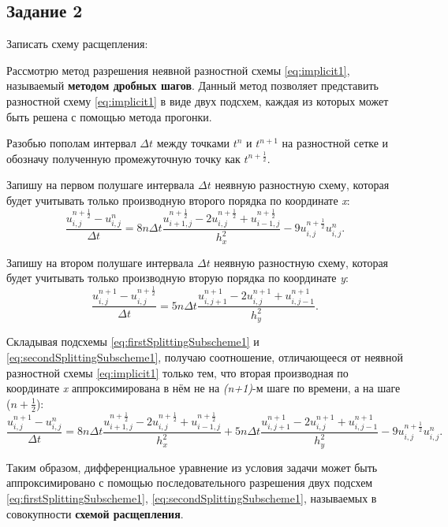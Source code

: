 \documentclass[12pt, a4paper]{report}
\begin{document}
	\subsection*{Задание 2}
	\large
	Записать схему расщепления: \par
	Рассмотрю метод разрешения неявной разностной схемы \eqref{eq:implicit1}, называемый \textbf{методом дробных шагов}. Данный метод позволяет представить разностной схему \eqref{eq:implicit1} в виде двух подсхем, каждая из которых может быть решена с помощью метода прогонки. \par
	Разобью пополам интервал $\Delta t$ между точками $t^{n}$ и $t^{n+1}$ на разностной сетке и обозначу полученную промежуточную точку как $t^{n+\frac{1}{2}}$. \par
	Запишу на первом полушаге интервала $\Delta t$ неявную разностную схему, которая будет учитывать только производную второго порядка по координате \textit{x}:
	\small
	\begin{equation}\label{eq:firstSplittingSubscheme1}
		\frac{u_{i, j}^{n+\frac{1}{2}} - u_{i, j}^{n}}{\Delta t} = 8n\Delta t\frac{u_{i+1, j}^{n+\frac{1}{2}} - 2u_{i, j}^{n+\frac{1}{2}} + u_{i-1, j}^{n+\frac{1}{2}}}{h_{x}^{2}} - 9u_{i, j}^{n+\frac{1}{2}}u_{i, j}^{n}.
	\end{equation}
	\par
	\large
	Запишу на втором полушаге интервала $\Delta t$ неявную разностную схему, которая будет учитывать только производную вторую порядка по координате \textit{y}:
	\begin{equation}\label{eq:secondSplittingSubscheme1}
		\frac{u_{i, j}^{n+1} - u_{i, j}^{n+\frac{1}{2}}}{\Delta t} = 5n\Delta t\frac{u_{i, j+1}^{n+1} - 2u_{i, j}^{n+1} + u_{i, j-1}^{n+1}}{h_{y}^{2}}.
	\end{equation}
	\par
	Складывая подсхемы \eqref{eq:firstSplittingSubscheme1} и \eqref{eq:secondSplittingSubscheme1}, получаю соотношение, отличающееся от неявной разностной схемы \eqref{eq:implicit1} только тем, что вторая производная по координате \textit{x} аппроксимирована в нём не на \textit{(n+1)}-м шаге по времени, а на шаге ($n+\frac{1}{2}$):
	\small
	\begin{equation}\label{eq:splittingScheme1}
		\frac{u_{i, j}^{n+1} - u_{i, j}^{n}}{\Delta t} = 8n\Delta t\frac{u_{i+1, j}^{n+\frac{1}{2}} - 2u_{i, j}^{n+\frac{1}{2}} + u_{i-1, j}^{n+\frac{1}{2}}}{h_{x}^{2}} + 5n\Delta t\frac{u_{i, j+1}^{n+1} - 2u_{i, j}^{n+1} + u_{i, j-1}^{n+1}}{h_{y}^{2}} - 9u_{i, j}^{n+\frac{1}{2}}u_{i, j}^{n}.
	\end{equation}
	\par
	\large
	Таким образом, дифференциальное уравнение из условия задачи может быть аппроксимировано с помощью последовательного разрешения двух подсхем \eqref{eq:firstSplittingSubscheme1}, \eqref{eq:secondSplittingSubscheme1}, называемых в совокупности \textbf{схемой расщепления}.
\end{document}
